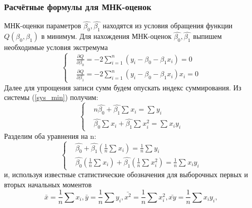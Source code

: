 \documentclass[a4paper]{article}
\begin{document}
	\subsubsection{Расчётные формулы для МНК-оценок}
	\noindent МНК-оценки параметров $\hat{\beta_0}, \hat{\beta_1}$ находятся из условия обращения функции $Q(\beta_0, \beta_1)$ в минимум. 
	\newline
	Для нахождения МНК-оценок $\hat{\beta_0}, \hat{\beta_1}$ выпишем необходимые условия экстремума
	\begin{equation}
	   \begin{cases}
         & \frac{\partial Q}{\partial \beta_{0}}  = 
         -2\sum_{i=1}^{n}{(y_{i} - \beta_{0} - \beta_{1}x_{i})} = 0\\ 
         & \frac{\partial Q}{\partial \beta_{1}}  = 
         -2\sum_{i=1}^{n}{(y_{i} - \beta_{0} - \beta_{1}x_{i})x_{i}} = 0 
       \end{cases}
       \label{sys_min}
	\end{equation}
	Далее для упрощения записи сумм будем опускать индекс суммирования. Из системы (\ref{sys_min}) получим:
	\begin{equation}
	   \begin{cases}
         & n\hat{\beta_{0}} + \hat{\beta_{1}}\sum_{}{}{x_{i}} = 
         \sum_{}{}{y_{i}}\\ 
        & \hat{\beta_{0}}\sum_{}{}{x_{i}} + \hat{\beta_{1}}\sum_{}{}{x_{i}^{2}} = \sum_{}{}{x_{i}y_{i}}
       \end{cases}
       \label{sys_2}
	\end{equation}
	Разделим оба уравнения на n:
	\begin{equation}
	   \begin{cases}
         & \hat{\beta_{0}} + \hat{\beta_{1}}(\frac{1}{n}\sum_{}{}{x_{i}}) = 
         \frac{1}{n}\sum_{}{}{y_{i}}\\ 
        & \hat{\beta_{0}}(\frac{1}{n}\sum_{}{}{x_{i}}) + \hat{\beta_{1}}(\frac{1}{n}\sum_{}{}{x_{i}^{2}}) = \frac{1}{n}\sum_{}{}{x_{i}y_{i}}
       \end{cases}
       \label{sys_3}
	\end{equation}
	и, используя известные статистические обозначения для выборочных первых и вторых начальных моментов
	\begin{equation}
	    \bar{x} = \frac{1}{n}\sum_{}{}{x_{i}}, \bar{y} = \frac{1}{n}\sum_{}{}{y_{i}}, \bar{x^{2}} = \frac{1}{n}\sum_{}{}{x_{i}^{2}}, \bar{xy} = \frac{1}{n}\sum_{}{}{x_{i}y_{i}}, 
	\end{equation}
\end{document}
